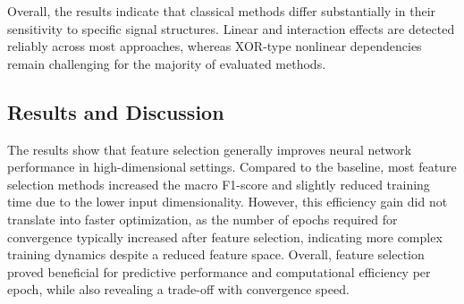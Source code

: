 Overall, the results indicate that classical methods differ substantially in their sensitivity to specific signal structures. Linear and interaction effects are detected reliably across most approaches, whereas XOR-type nonlinear dependencies remain challenging for the majority of evaluated methods.

\subsection{Results and Discussion}
The results show that feature selection generally improves neural network performance in high-dimensional settings. Compared to the baseline, most feature selection methods increased the macro F1-score and slightly reduced training time due to the lower input dimensionality. However, this efficiency gain did not translate into faster optimization, as the number of epochs required for convergence typically increased after feature selection, indicating more complex training dynamics despite a reduced feature space. Overall, feature selection proved beneficial for predictive performance and computational efficiency per epoch, while also revealing a trade-off with convergence speed.